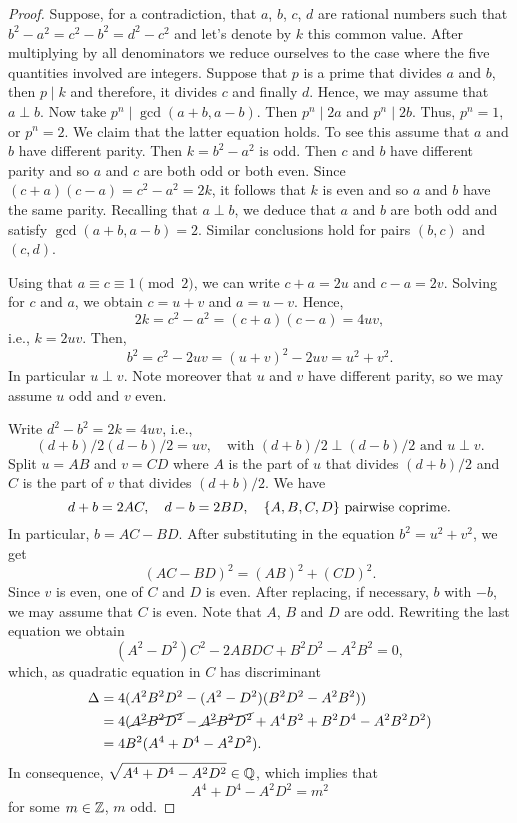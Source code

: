 \begin{proof}
    Suppose, for a contradiction, that $a$, $b$, $c$, $d$ are rational numbers such that $b^2-a^2=c^2-b^2=d^2-c^2$ and let's denote by $k$ this common value. After multiplying by all denominators we reduce ourselves to the case where the five quantities involved are integers. Suppose that $p$ is a prime that divides $a$ and $b$, then $p\mid k$ and therefore, it divides $c$ and finally $d$. Hence, we may assume that $a\perp b$. Now take $p^n\mid\gcd(a+b,a-b)$. Then $p^n\mid2a$ and $p^n\mid2b$. Thus, $p^n=1$, or $p^n=2$. We claim that the latter equation holds. To see this assume that $a$ and $b$ have different parity. Then $k=b^2-a^2$ is odd. Then $c$ and $b$ have different parity and so $a$ and $c$ are both odd or both even. Since $(c+a)(c-a)=c^2-a^2=2k$, it follows that $k$ is even and so $a$ and $b$ have the same parity. Recalling that $a\perp b$, we deduce that $a$ and $b$ are both odd and satisfy $\gcd(a+b,a-b)=2$. Similar conclusions hold for pairs $(b,c)$ and $(c,d)$.

    Using that $a\equiv c\equiv1\pmod2$, we can write $c+a=2u$ and $c-a=2v$. Solving for $c$ and $a$, we obtain $c=u+v$ and $a=u-v$. Hence,
    $$
        2k=c^2-a^2=(c+a)(c-a)=4uv,
    $$
    i.e., $k = 2uv$. Then,
    $$
        b^2 = c^2-2uv = (u+v)^2-2uv = u^2+v^2.
    $$
    In particular $u\perp v$. Note moreover that $u$ and $v$ have different parity, so we may assume $u$ odd and $v$ even.

    Write $d^2-b^2=2k=4uv$, i.e.,
    $$
        (d+b)/2(d-b)/2=uv,\quad\text{with }(d+b)/2\perp(d-b)/2\text{ and }u\perp v.
    $$
    Split $u=AB$ and $v=CD$ where $A$ is the part of $u$ that divides $(d+b)/2$ and $C$ is the part of $v$ that divides $(d+b)/2$. We have
    $$
        d+b = 2AC,\quad d-b = 2BD,\quad\{A,B,C,D\} \text{ pairwise coprime}.
    $$
    In particular, $b=AC-BD$. After substituting in the equation $b^2=u^2+v^2$, we get
    $$
        (AC-BD)^2 = (AB)^2 + (CD)^2.
    $$
    Since $v$ is even, one of $C$ and $D$ is even. After replacing, if necessary, $b$ with $-b$, we may assume that $C$ is even. Note that $A$, $B$ and $D$ are odd. Rewriting the last equation we obtain
    $$
        (A^2-D^2)C^2 - 2ABDC + B^2D^2-A^2B^2 = 0,
    $$
    which, as quadratic equation in $C$ has discriminant
    \begin{align*}
        \Delta &= 4(A^2B^2D^2-(A^2-D^2)(B^2D^2-A^2B^2))\\
            &= 4(\cancel{A^2B^2D^2}-\cancel{A^2B^2D^2}+A^4B^2+B^2D^4-A^2B^2D^2)\\
            &= 4B^2(A^4+D^4-A^2D^2).
    \end{align*}
    In consequence, $\sqrt{\vphantom{A^|}A^4+D^4-A^2D^2}\in\mathbb{Q}$, which implies that
    $$
        A^4+D^4-A^2D^2=m^2
    $$
    for some $m\in\mathbb{Z}$, $m$ odd.


\end{proof}
